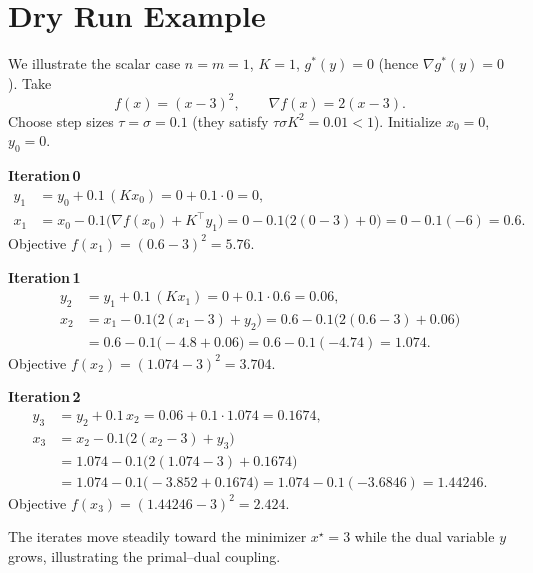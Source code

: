 \documentclass{article}
\begin{document}
\section*{Dry Run Example}
We illustrate the scalar case $n=m=1$, $K=1$, $g^{*}(y)=0$ (hence $\nabla g^{*}(y)=0$).  
Take
\[
f(x)=(x-3)^{2},\qquad \nabla f(x)=2(x-3).
\]
Choose step sizes $\tau=\sigma=0.1$ (they satisfy $\tau\sigma K^{2}=0.01<1$).  
Initialize $x_{0}=0$, $y_{0}=0$.

\bigskip
\noindent\textbf{Iteration 0}
\[
\begin{aligned}
y_{1}&=y_{0}+0.1\,(Kx_{0})=0+0.1\cdot0=0,\\
x_{1}&=x_{0}-0.1\bigl(\nabla f(x_{0})+K^{\top}y_{1}\bigr)
      =0-0.1\bigl(2(0-3)+0\bigr)=0-0.1(-6)=0.6 .
\end{aligned}
\]
Objective $f(x_{1})=(0.6-3)^{2}=5.76$.

\bigskip
\noindent\textbf{Iteration 1}
\[
\begin{aligned}
y_{2}&=y_{1}+0.1\,(Kx_{1})=0+0.1\cdot0.6=0.06,\\
x_{2}&=x_{1}-0.1\bigl(2(x_{1}-3)+y_{2}\bigr)
      =0.6-0.1\bigl(2(0.6-3)+0.06\bigr)\\
     &=0.6-0.1\bigl(-4.8+0.06\bigr)=0.6-0.1(-4.74)=1.074 .
\end{aligned}
\]
Objective $f(x_{2})=(1.074-3)^{2}=3.704.\,$

\bigskip
\noindent\textbf{Iteration 2}
\[
\begin{aligned}
y_{3}&=y_{2}+0.1\,x_{2}=0.06+0.1\cdot1.074=0.1674,\\
x_{3}&=x_{2}-0.1\bigl(2(x_{2}-3)+y_{3}\bigr)\\
     &=1.074-0.1\bigl(2(1.074-3)+0.1674\bigr)\\
     &=1.074-0.1\bigl(-3.852+0.1674\bigr)=1.074-0.1(-3.6846)=1.44246 .
\end{aligned}
\]
Objective $f(x_{3})=(1.44246-3)^{2}=2.424.$

The iterates move steadily toward the minimizer $x^{\star}=3$ while the dual variable $y$ grows, illustrating the primal–dual coupling.

\newpage
\end{document}
